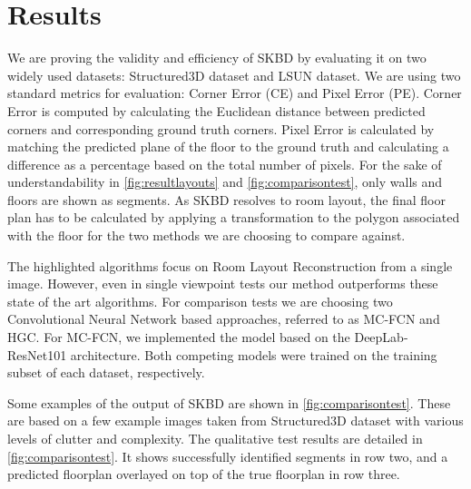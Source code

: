 \section{Results}
\label{sec:results}
We are proving the validity and efficiency of SKBD by evaluating it on two widely used datasets: Structured3D dataset\cite{zheng2020structured3d} and LSUN dataset\cite{zhang2015large}. We are using two standard metrics for evaluation: Corner Error (CE) and Pixel Error (PE). Corner Error is computed by calculating the Euclidean distance between predicted corners and corresponding ground truth corners. Pixel Error is calculated by matching the predicted plane of the floor to the ground truth and calculating a difference as a percentage based on the total number of pixels. For the sake of understandability in \autoref{fig:resultlayouts} and \autoref{fig:comparisontest}, only walls and floors are shown as segments. As SKBD resolves to room layout, the final floor plan has to be calculated by applying a transformation to the polygon associated with the floor for the two methods we are choosing to compare against.

The highlighted algorithms\cite{8451365}\cite{10350607} focus on Room Layout Reconstruction from a single image. However, even in single viewpoint tests our method outperforms these state of the art algorithms. For comparison tests we are choosing two Convolutional Neural Network based approaches, referred to as MC-FCN\cite{8451365} and HGC\cite{10350607}. For MC-FCN, we implemented the model based on the DeepLab-ResNet101\cite{chen2017deeplab} architecture. Both competing models were trained on the training subset of each dataset, respectively.

Some examples of the output of SKBD are shown in \autoref{fig:comparisontest}. These are based on a few example images taken from Structured3D dataset\cite{zheng2020structured3d} with various levels of clutter and complexity. The qualitative test results are detailed in \autoref{fig:comparisontest}. It shows successfully identified segments in row two, and a predicted floorplan overlayed on top of the true floorplan in row three.

